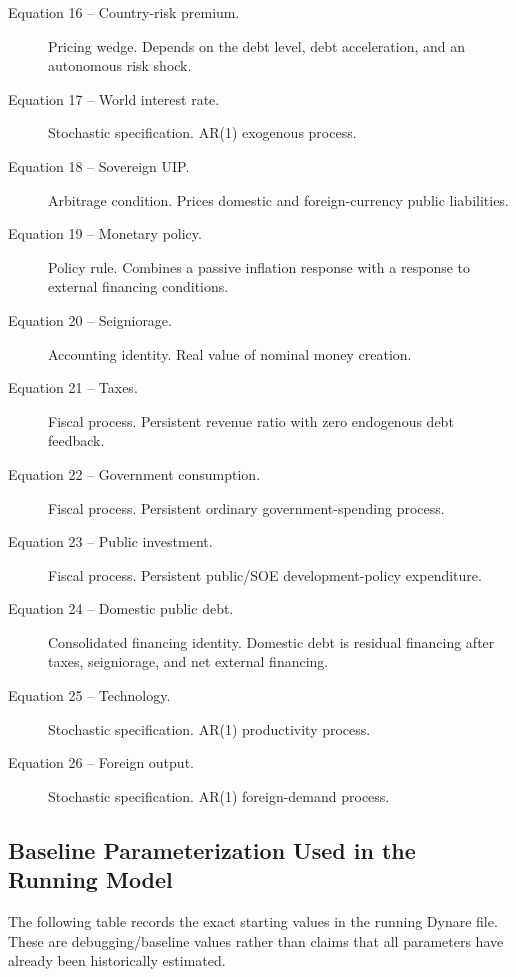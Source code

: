 \begin{description}
\item[Equation 16 -- Country-risk premium.] Pricing wedge. Depends on the debt level, debt acceleration, and an autonomous risk shock.
\item[Equation 17 -- World interest rate.] Stochastic specification. AR(1) exogenous process.
\item[Equation 18 -- Sovereign UIP.] Arbitrage condition. Prices domestic and foreign-currency public liabilities.
\item[Equation 19 -- Monetary policy.] Policy rule. Combines a passive inflation response with a response to external financing conditions.
\item[Equation 20 -- Seigniorage.] Accounting identity. Real value of nominal money creation.
\item[Equation 21 -- Taxes.] Fiscal process. Persistent revenue ratio with zero endogenous debt feedback.
\item[Equation 22 -- Government consumption.] Fiscal process. Persistent ordinary government-spending process.
\item[Equation 23 -- Public investment.] Fiscal process. Persistent public/SOE development-policy expenditure.
\item[Equation 24 -- Domestic public debt.] Consolidated financing identity. Domestic debt is residual financing after taxes, seigniorage, and net external financing.
\item[Equation 25 -- Technology.] Stochastic specification. AR(1) productivity process.
\item[Equation 26 -- Foreign output.] Stochastic specification. AR(1) foreign-demand process.
\end{description}

\subsection{Baseline Parameterization Used in the Running Model}
\label{app:parameters}

The following table records the exact starting values in the running Dynare
file. These are debugging/baseline values rather than claims that all parameters
have already been historically estimated.

